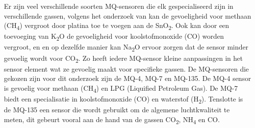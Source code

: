 Er zijn veel verschillende soorten MQ-sensoren die elk gespecialiseerd zijn in verschillende gassen, volgens het onderzoek van
kan de gevoeligheid voor methaan (CH\textsubscript{4}) vergroot door platina toe te voegen aan de SnO\textsubscript{2}. Ook kan door een toevoeging van K\textsubscript{2}O de gevoeligheid voor koolstofmonoxide (CO) worden vergroot, en en op dezelfde manier kan Na\textsubscript{2}O ervoor zorgen dat de sensor minder gevoelig wordt voor CO\textsubscript{2}. Zo heeft iedere MQ-sensor kleine aanpassingen in het sensor element wat ze gevoelig maakt voor specifieke gassen.
De MQ-sensoren die gekozen zijn voor dit onderzoek zijn de MQ-4, MQ-7 en MQ-135. De MQ-4 sensor is gevoelig voor methaan (CH\textsubscript{4}) en LPG (Liquified Petroleum Gas). De MQ-7 biedt een specialisatie in koolstofmonoxide (CO) en waterstof (H\textsubscript{2}). Tenslotte is de MQ-135 een sensor die wordt gebruikt om de algemene luchtkwaliteit te meten, dit gebeurt vooral aan de hand van de gassen CO\textsubscript{2}, NH\textsubscript{4} en CO.

